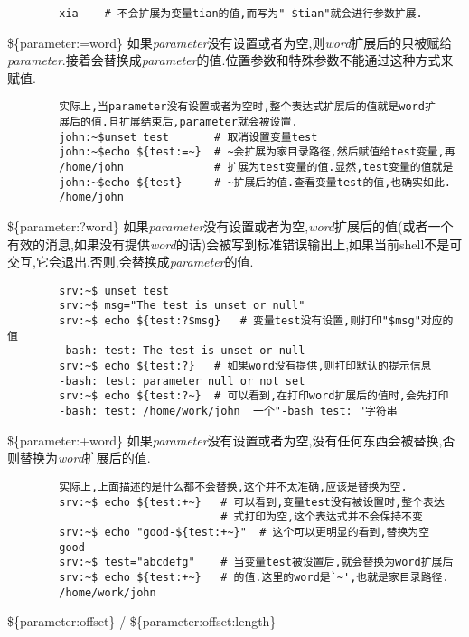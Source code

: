 \documentclass[draft,openany]{book}
\begin{document}
\begin{CJK}{UTF8}{gbsn}
\begin{basedescript}{\desclabelstyle{\nextlinelabel}\desclabelwidth{2.5em}}
\begin{verbatim}
        xia    # 不会扩展为变量tian的值,而写为"-$tian"就会进行参数扩展.
        \end{verbatim}
    \item[\$\{parameter:=word\}] 如果\emph{parameter}没有设置或者为空,则\emph{word}扩展后的只被赋给\emph{parameter}.接着会替换成\emph{parameter}的值.位置参数和特殊参数不能通过这种方式来赋值.
        \begin{verbatim}
        实际上,当parameter没有设置或者为空时,整个表达式扩展后的值就是word扩
        展后的值.且扩展结束后,parameter就会被设置.
        john:~$unset test       # 取消设置变量test
        john:~$echo ${test:=~}  # ~会扩展为家目录路径,然后赋值给test变量,再
        /home/john              # 扩展为test变量的值.显然,test变量的值就是
        john:~$echo ${test}     # ~扩展后的值.查看变量test的值,也确实如此.
        /home/john
        \end{verbatim}
    \item[\$\{parameter:?word\}] 如果\emph{parameter}没有设置或者为空,\emph{word}扩展后的值(或者一个有效的消息,如果没有提供\emph{word}的话)会被写到标准错误输出上,如果当前shell不是可交互,它会退出.否则,会替换成\emph{parameter}的值.
        \begin{verbatim}
        srv:~$ unset test
        srv:~$ msg="The test is unset or null"
        srv:~$ echo ${test:?$msg}   # 变量test没有设置,则打印"$msg"对应的值
        -bash: test: The test is unset or null
        srv:~$ echo ${test:?}   # 如果word没有提供,则打印默认的提示信息
        -bash: test: parameter null or not set
        srv:~$ echo ${test:?~}  # 可以看到,在打印word扩展后的值时,会先打印
        -bash: test: /home/work/john  一个"-bash test: "字符串
        \end{verbatim}
    \item[\$\{parameter:+word\}] 如果\emph{parameter}没有设置或者为空,没有任何东西会被替换,否则替换为\emph{word}扩展后的值.
        \begin{verbatim}
        实际上,上面描述的是什么都不会替换,这个并不太准确,应该是替换为空.
        srv:~$ echo ${test:+~}   # 可以看到,变量test没有被设置时,整个表达
                                 # 式打印为空,这个表达式并不会保持不变
        srv:~$ echo "good-${test:+~}"  # 这个可以更明显的看到,替换为空
        good-
        srv:~$ test="abcdefg"    # 当变量test被设置后,就会替换为word扩展后
        srv:~$ echo ${test:+~}   # 的值.这里的word是`~',也就是家目录路径.
        /home/work/john
        \end{verbatim}
    \item[\$\{parameter:offset\} / \$\{parameter:offset:length\}]

\end{basedescript}
\end{CJK}
\end{document}
